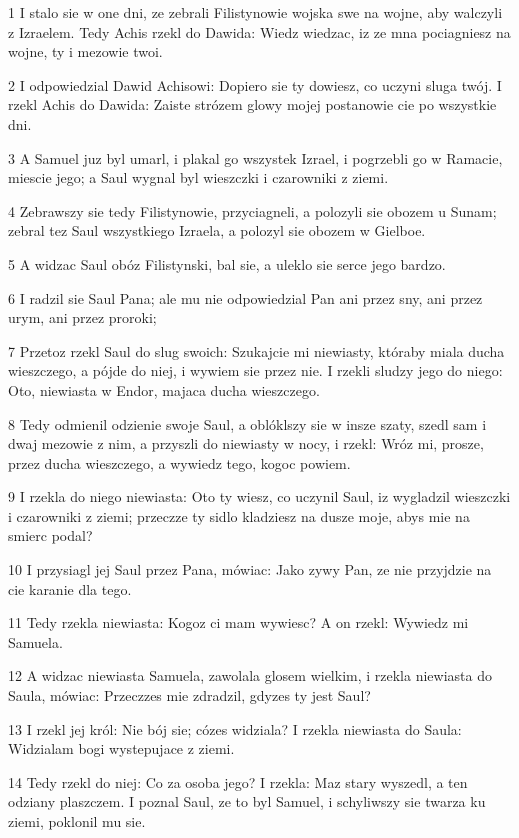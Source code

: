 \par 1 I stalo sie w one dni, ze zebrali Filistynowie wojska swe na wojne, aby walczyli z Izraelem. Tedy Achis rzekl do Dawida: Wiedz wiedzac, iz ze mna pociagniesz na wojne, ty i mezowie twoi.
\par 2 I odpowiedzial Dawid Achisowi: Dopiero sie ty dowiesz, co uczyni sluga twój. I rzekl Achis do Dawida: Zaiste strózem glowy mojej postanowie cie po wszystkie dni.
\par 3 A Samuel juz byl umarl, i plakal go wszystek Izrael, i pogrzebli go w Ramacie, miescie jego; a Saul wygnal byl wieszczki i czarowniki z ziemi.
\par 4 Zebrawszy sie tedy Filistynowie, przyciagneli, a polozyli sie obozem u Sunam; zebral tez Saul wszystkiego Izraela, a polozyl sie obozem w Gielboe.
\par 5 A widzac Saul obóz Filistynski, bal sie, a uleklo sie serce jego bardzo.
\par 6 I radzil sie Saul Pana; ale mu nie odpowiedzial Pan ani przez sny, ani przez urym, ani przez proroki;
\par 7 Przetoz rzekl Saul do slug swoich: Szukajcie mi niewiasty, któraby miala ducha wieszczego, a pójde do niej, i wywiem sie przez nie. I rzekli sludzy jego do niego: Oto, niewiasta w Endor, majaca ducha wieszczego.
\par 8 Tedy odmienil odzienie swoje Saul, a oblóklszy sie w insze szaty, szedl sam i dwaj mezowie z nim, a przyszli do niewiasty w nocy, i rzekl: Wróz mi, prosze, przez ducha wieszczego, a wywiedz tego, kogoc powiem.
\par 9 I rzekla do niego niewiasta: Oto ty wiesz, co uczynil Saul, iz wygladzil wieszczki i czarowniki z ziemi; przeczze ty sidlo kladziesz na dusze moje, abys mie na smierc podal?
\par 10 I przysiagl jej Saul przez Pana, mówiac: Jako zywy Pan, ze nie przyjdzie na cie karanie dla tego.
\par 11 Tedy rzekla niewiasta: Kogoz ci mam wywiesc? A on rzekl: Wywiedz mi Samuela.
\par 12 A widzac niewiasta Samuela, zawolala glosem wielkim, i rzekla niewiasta do Saula, mówiac: Przeczzes mie zdradzil, gdyzes ty jest Saul?
\par 13 I rzekl jej król: Nie bój sie; cózes widziala? I rzekla niewiasta do Saula: Widzialam bogi wystepujace z ziemi.
\par 14 Tedy rzekl do niej: Co za osoba jego? I rzekla: Maz stary wyszedl, a ten odziany plaszczem. I poznal Saul, ze to byl Samuel, i schyliwszy sie twarza ku ziemi, poklonil mu sie.
